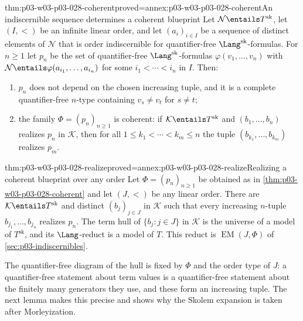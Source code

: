 \begin{hblemma}{thm:p03-w03-p03-028-coherent}{proved=annex:p03-w03-p03-028-coherent}{An indiscernible sequence determines a coherent blueprint}
Let \(\mathcal N\entails T^{\mathrm{sk}}\), let \((I,<)\) be an infinite
linear order, and let \((a_i)_{i\in I}\) be a sequence of distinct elements
of \(\mathcal N\) that is order indiscernible for quantifier-free
\(\Lang^{\mathrm{sk}}\)-formulas.  For \(n\geq1\) let \(p_n\) be the set
of quantifier-free \(\Lang^{\mathrm{sk}}\)-formulas
\(\varphi(v_1,\ldots,v_n)\) with
\(\mathcal N\entails\varphi(a_{i_1},\ldots,a_{i_n})\) for some
\(i_1<\cdots<i_n\) in \(I\).  Then:
\begin{enumerate}
\item \(p_n\) does not depend on the chosen increasing tuple, and it is a
complete quantifier-free \(n\)-type containing \(v_s\neq v_t\) for
\(s\neq t\);
\item the family \(\Phi=(p_n)_{n\geq1}\) is coherent: if
\(\mathcal K\entails T^{\mathrm{sk}}\) and \((b_1,\ldots,b_n)\) realizes
\(p_n\) in \(\mathcal K\), then for all \(1\leq k_1<\cdots<k_m\leq n\) the
tuple \((b_{k_1},\ldots,b_{k_m})\) realizes \(p_m\).
\end{enumerate}
\end{hblemma}

\begin{hblemma}{thm:p03-w03-p03-028-realize}{proved=annex:p03-w03-p03-028-realize}{Realizing a coherent blueprint over any order}
Let \(\Phi=(p_n)_{n\geq1}\) be obtained as in
\cref{thm:p03-w03-p03-028-coherent} and let \((J,<)\) be any linear order.
There are \(\mathcal K\entails T^{\mathrm{sk}}\) and distinct
\((b_j)_{j\in J}\) in \(\mathcal K\) such that every increasing
\(n\)-tuple \(b_{j_1},\ldots,b_{j_n}\) realizes \(p_n\).  The term hull of
\(\{b_j:j\in J\}\) in \(\mathcal K\) is the universe of a model of
\(T^{\mathrm{sk}}\), and its \(\Lang\)-reduct is a model of \(T\).  This
reduct is \(\operatorname{EM}(J,\Phi)\) of \cref{sec:p03-indiscernibles}.
\end{hblemma}

The quantifier-free diagram of the hull is fixed by \(\Phi\) and the order
type of \(J\): a quantifier-free statement about term values is a
quantifier-free statement about the finitely many generators they use, and
these form an increasing tuple.  The next lemma makes this precise and
shows why the Skolem expansion is taken after Morleyization.

